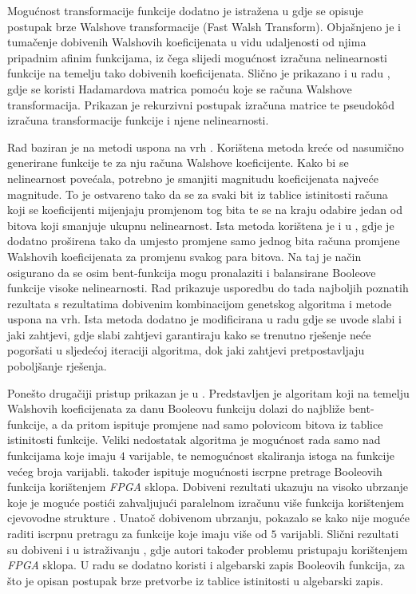 Mogućnost transformacije funkcije dodatno je istražena u \cite{MeasuringBoolean} gdje se opisuje postupak brze Walshove transformacije \engl(Fast Walsh Transform).
Objašnjeno je i tumačenje dobivenih Walshovih koeficijenata u vidu udaljenosti od njima pripadnim afinim funkcijama, iz čega slijedi mogućnost izračuna nelinearnosti funkcije na temelju tako dobivenih koeficijenata.
Slično je prikazano i u radu \cite{CalculatingNonlinearity}, gdje se koristi Hadamardova matrica pomoću koje se računa Walshove transformacija.
Prikazan je rekurzivni postupak izračuna matrice te pseudok\^{o}d izračuna transformacije funkcije i njene nelinearnosti.

Rad \cite{millan1997smart} baziran je na metodi uspona na vrh .
Korištena metoda kreće od nasumično generirane funkcije te za nju računa Walshove koeficijente.
Kako bi se nelinearnost povećala, potrebno je smanjiti magnitudu koeficijenata najveće magnitude.
To je ostvareno tako da se za svaki bit iz tablice istinitosti računa koji se koeficijenti mijenjaju promjenom tog bita te se na kraju odabire jedan od bitova koji smanjuje ukupnu nelinearnost.
Ista metoda korištena je i u \cite{millan1997effective}, gdje je dodatno proširena tako da umjesto promjene samo jednog bita računa promjene Walshovih koeficijenata za promjenu svakog para bitova.
Na taj je način osigurano da se osim bent-funkcija mogu pronalaziti i balansirane Booleove funkcije visoke nelinearnosti.
Rad \cite{millan1998heuristic} prikazuje usporedbu do tada najboljih poznatih rezultata s rezultatima dobivenim kombinacijom genetskog algoritma i metode uspona na vrh.
Ista metoda dodatno je modificirana u radu \cite{millan1999boolean} gdje se uvode slabi  i jaki  zahtjevi, gdje slabi zahtjevi garantiraju kako se trenutno rješenje neće pogoršati u sljedećoj iteraciji algoritma, dok jaki zahtjevi pretpostavljaju poboljšanje rješenja.

Ponešto drugačiji pristup prikazan je u \cite{DiscoveryOfBent}.
Predstavljen je algoritam koji na temelju Walshovih koeficijenata za danu Booleovu funkciju dolazi do najbliže bent-funkcije, a da pritom ispituje promjene nad samo polovicom bitova iz tablice istinitosti funkcije.
Veliki nedostatak algoritma je mogućnost rada samo nad funkcijama koje imaju $4$ varijable, te nemogućnost skaliranja istoga na funkcije većeg broja varijabli.
\cite{DiscoveryOfBent} također ispituje mogućnosti iscrpne pretrage Booleovih funkcija korištenjem \textit{FPGA} sklopa.
Dobiveni rezultati ukazuju na visoko ubrzanje koje je moguće postići zahvaljujući paralelnom izračunu više funkcija korištenjem cjevovodne strukture .
Unatoč dobivenom ubrzanju, pokazalo se kako nije moguće raditi iscrpnu pretragu za funkcije koje imaju više od $5$ varijabli.
Slični rezultati su dobiveni i u istraživanju \cite{EnumerationOfBentBoolean}, gdje autori također problemu pristupaju korištenjem \textit{FPGA} sklopa.
U radu se dodatno koristi i algebarski zapis Booleovih funkcija, za što je opisan postupak brze pretvorbe iz tablice istinitosti u algebarski zapis.

